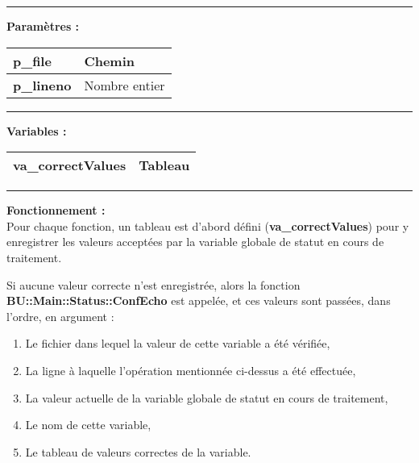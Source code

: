 \documentclass[a4paper,10pt]{article}
\begin{document}

\par\noindent\rule{\textwidth}{0.4pt}

\begin{justify}
    \textbf{Paramètres :}

    \begin{tabular}{|l|l|}
        \hline
        \textbf{\color{vars}p\_file} & Chemin\\
        \hline
        \textbf{\color{vars}p\_lineno} & Nombre entier\\
        \hline
    \end{tabular}
\end{justify}

\setlength{\parskip}{2em}


\par\noindent\rule{\textwidth}{0.4pt}\setlength{\parskip}{1em}

\begin{justify}
    \textbf{Variables :}

    \begin{tabular}{|l|l|}
        \hline
        \textbf{\color{vars}va\_correctValues} & Tableau\\
        \hline
    \end{tabular}
\end{justify}\setlength{\parskip}{1em}


\par\noindent\rule{\textwidth}{0.4pt}

\begin{justify}
    \textbf{Fonctionnement :}\\[1\baselineskip]
    Pour chaque fonction, un tableau est d'abord défini (\textbf{\color{vars}va\_correctValues}) pour y enregistrer les valeurs acceptées par la variable globale de statut en cours de traitement.
\end{justify}

\begin{justify}
    Si aucune valeur correcte n'est enregistrée, alors la fonction \textbf{\color{func}BU::Main::Status::ConfEcho} est appelée, et ces valeurs sont passées, dans l'ordre, en argument :

    \begin{enumerate}
        \item Le fichier dans lequel la valeur de cette variable a été vérifiée,
        \item La ligne à laquelle l'opération mentionnée ci-dessus a été effectuée,
        \item La valeur actuelle de la variable globale de statut en cours de traitement,
        \item Le nom de cette variable,
        \item Le tableau de valeurs correctes de la variable.
    \end{enumerate}
\end{justify}
\end{document}
